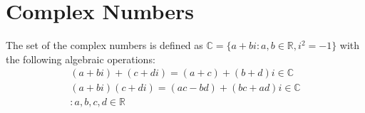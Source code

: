 \section{Complex Numbers}
The set of the complex numbers is defined as 
$\mathbb{C} = \{a + bi : a,b \in \mathbb{R},i^2 = -1\}$
with the following algebraic operations:
\begin{equation} \label{equation: complex operations}
\begin{split}
    (a + bi) + (c + di) = (a + c) + (b + d)i \in \mathbb{C}\\
    (a + bi)(c + di) = (ac - bd) + (bc + ad)i \in \mathbb{C}\\
    :a,b,c,d \in \mathbb{R}
\end{split}
\end{equation}